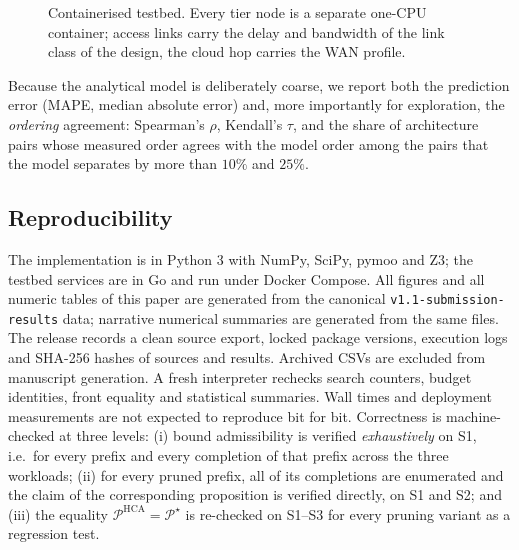 \documentclass[preprint,11pt,3p]{elsarticle}
\theoremstyle{plain}
\theoremstyle{definition}
\newcommand{\PS}{\mathcal{P}^{\star}}
\begin{document}
\begin{figure}[t]
\centering
{}
\caption{Containerised testbed. Every tier node is a separate one-CPU container; access
links carry the delay and bandwidth of the link class of the design, the cloud hop
carries the WAN profile.}
\label{fig:testbed}
\end{figure}

Because the analytical model is deliberately coarse, we report both the prediction error
(MAPE, median absolute error) and, more importantly for exploration, the \emph{ordering}
agreement: Spearman's $\rho$, Kendall's $\tau$, and the share of architecture pairs whose
measured order agrees with the model order among the pairs that the model separates by
more than $10\%$ and $25\%$.

\subsection{Reproducibility}
The implementation is in Python 3 with NumPy, SciPy, pymoo and Z3; the testbed services are
in Go and run under Docker Compose. All figures and all numeric tables of this paper are
generated from the canonical \texttt{v1.1-submission-results} data; narrative numerical
summaries are generated from the same files. The release records a clean source export,
locked package versions, execution logs and SHA-256 hashes of sources and results.
Archived CSVs are excluded from manuscript generation. A fresh interpreter rechecks
search counters, budget identities, front equality and statistical summaries. Wall times
and deployment measurements are not expected to reproduce bit for bit. Correctness is machine-checked at three levels: (i) bound admissibility is verified
\emph{exhaustively} on S1, i.e.\ for every prefix and every completion of that prefix
across the three workloads; (ii) for every pruned prefix, all of its completions are
enumerated and the claim of the corresponding proposition is verified directly, on S1 and
S2; and (iii) the equality $\mathcal{P}^{\mathrm{HCA}}=\PS$ is re-checked on S1--S3 for
every pruning variant as a regression test.
\end{document}
